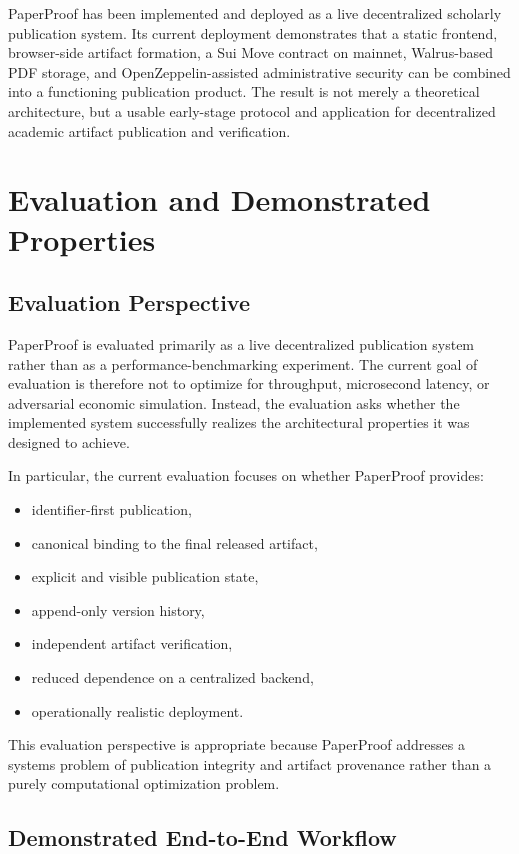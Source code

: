\documentclass[journal]{IEEEtran}
\begin{document}
PaperProof has been implemented and deployed as a live decentralized scholarly publication system. Its current deployment demonstrates that a static frontend, browser-side artifact formation, a Sui Move contract on mainnet, Walrus-based PDF storage, and OpenZeppelin-assisted administrative security can be combined into a functioning publication product. The result is not merely a theoretical architecture, but a usable early-stage protocol and application for decentralized academic artifact publication and verification.

\section{Evaluation and Demonstrated Properties}

\subsection{Evaluation Perspective}

PaperProof is evaluated primarily as a live decentralized publication system rather than as a performance-benchmarking experiment. The current goal of evaluation is therefore not to optimize for throughput, microsecond latency, or adversarial economic simulation. Instead, the evaluation asks whether the implemented system successfully realizes the architectural properties it was designed to achieve.

In particular, the current evaluation focuses on whether PaperProof provides:
\begin{itemize}
    \item identifier-first publication,
    \item canonical binding to the final released artifact,
    \item explicit and visible publication state,
    \item append-only version history,
    \item independent artifact verification,
    \item reduced dependence on a centralized backend,
    \item operationally realistic deployment.
\end{itemize}

This evaluation perspective is appropriate because PaperProof addresses a systems problem of publication integrity and artifact provenance rather than a purely computational optimization problem.

\subsection{Demonstrated End-to-End Workflow}
\end{document}
